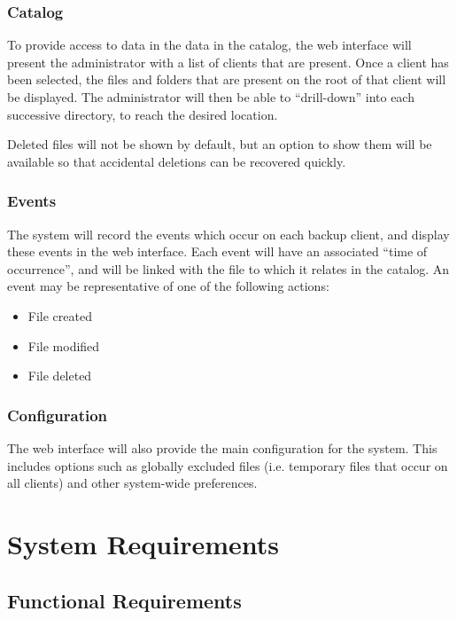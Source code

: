 \subsubsection{Catalog}

To provide access to data in the data in the catalog, the web interface will
present the administrator with a list of clients that are present. Once
a client has been selected, the files and folders that are present on the root
of that client will be displayed. The administrator will then be able to
``drill-down'' into each successive directory, to reach the desired location.

Deleted files will not be shown by default, but an option to show them will be
available so that accidental deletions can be recovered quickly.

\subsubsection{Events}

The system will record the events which occur on each backup client, and
display these events in the web interface. Each event will have an associated
``time of occurrence'', and will be linked with the file to which it relates in
the catalog. An event may be representative of one of the following actions:

\begin{itemize}
    \item File created
    \item File modified
    \item File deleted
\end{itemize}

\subsubsection{Configuration}

The web interface will also provide the main configuration for the system. This
includes options such as globally excluded files (i.e. temporary files that
occur on all clients) and other system-wide preferences.

\section{System Requirements}

\subsection{Functional Requirements}

